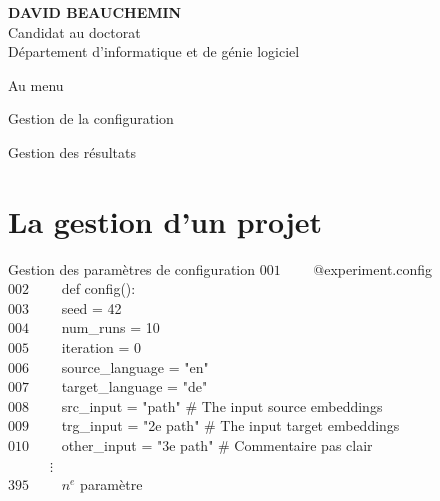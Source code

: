 \documentclass[aspectratio=169,10pt,xcolor=x11names,english,french]{beamer}
\makeatletter
\newenvironment{Scode}{%
	\def\FrameCommand##1{\hskip\@totalleftmargin
		\vrule width 3pt\colorbox{codebg}{\hspace{5pt}##1}%
		\hskip-\linewidth \hskip-\@totalleftmargin \hskip\columnwidth}%
	\MakeFramed {\advance\hsize-\width
		\@totalleftmargin\z@ \linewidth\hsize
		\advance\labelsep\fboxsep
		\@setminipage}%
}{\par\unskip\@minipagefalse\endMakeFramed}
\makeatother
\begin{document}
\begin{frame}
		\begin{minipage}{0.25\linewidth}
			\small
			\textbf{DAVID BEAUCHEMIN} \\
			Candidat au doctorat \\
			Département d'informatique et de génie logiciel
		\end{minipage}
	\end{frame}

	\begin{frame}{Au menu}
		\begin{minipage}{0.49\linewidth}
				\centering
				\fontsize{35}{35}\faCog\vfil
				\vspace{1em}
				\normalsize Gestion de la configuration
				
		\end{minipage}
		\begin{minipage}{0.49\linewidth}
				\centering
				\fontsize{35}{35}\faAreaChart\vfil
				\vspace{1em}
				\normalsize Gestion des résultats
		\end{minipage}
	\end{frame}
	
	\section{La gestion d'un projet}
	\begin{frame}{Gestion des paramètres de configuration}
		\begin{Scode} %
			$001 \qquad$ @experiment.config \\
			$002 \qquad$ def config(): \\
			$003 \qquad$ \quad	seed = 42 \\
			$004 \qquad$ \quad	num\_runs = 10 \\
			$005 \qquad$ \quad	iteration = 0 \\
			$006 \qquad$ \quad	source\_language = "en" \\
			$007 \qquad$ \quad	target\_language = "de" \\
			$008 \qquad$ \quad 	src\_input = "path"  \# The input source embeddings \\
			$009 \qquad$ \quad 	trg\_input = "2e path" \# The input target embeddings \\
			$010 \qquad$ \quad 	other\_input = "3e path" \# Commentaire pas clair \\
			$\:\:\: \qquad$ \quad   $\vdots$ \\
			$395 \qquad$ \quad   $n^e$ paramètre \\
		\end{Scode}
	\end{frame}
\end{document}
